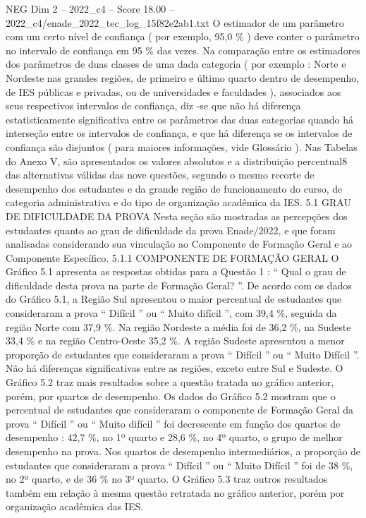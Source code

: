 \begin{textsample}{NEG Dim 2 – 2022\_c4 – Score 18.00 – 2022\_c4/enade\_2022\_tec\_log\_15f82e2ab1.txt}
O estimador de um parâmetro com um certo nível de confiança ( por exemplo, 95,0 \% ) deve conter o parâmetro no intervalo de confiança em 95 \% das vezes.
Na comparação entre os estimadores dos parâmetros de duas classes de uma dada categoria ( por exemplo : Norte e Nordeste nas grandes regiões, de primeiro e último quarto dentro de desempenho, de IES públicas e privadas, ou de universidades e faculdades ), associados aos seus respectivos intervalos de confiança, diz -se que não há diferença estatisticamente significativa entre os parâmetros das duas categorias quando há interseção entre os intervalos de confiança, e que há diferença se os intervalos de confiança são disjuntos ( para maiores informações, vide Glossário ).
Nas Tabelas do Anexo V, são apresentados os valores absolutos e a distribuição percentual8 das alternativas válidas das nove questões, segundo o mesmo recorte de desempenho dos estudantes e da grande região de funcionamento do curso, de categoria administrativa e do tipo de organização acadêmica da IES. 5.1 GRAU DE DIFICULDADE DA PROVA Nesta seção são mostradas as percepções dos estudantes quanto ao grau de dificuldade da prova Enade/2022, e que foram analisadas considerando sua vinculação ao Componente de Formação Geral e ao Componente Específico. 5.1.1 COMPONENTE DE FORMAÇÃO GERAL O Gráfico 5.1 apresenta as respostas obtidas para a Questão 1 : “ Qual o grau de dificuldade desta prova na parte de Formação Geral? ”.
De acordo com os dados do Gráfico 5.1, a Região Sul apresentou o maior percentual de estudantes que consideraram a prova “ Difícil ” ou “ Muito difícil ”, com 39,4 \%, seguida da região Norte com 37,9 \%.
Na região Nordeste a média foi de 36,2 \%, na Sudeste 33,4 \% e na região Centro-Oeste 35,2 \%.
A região Sudeste apresentou a menor proporção de estudantes que consideraram a prova “ Difícil ” ou “ Muito Difícil ”.
Não há diferenças significativas entre as regiões, exceto entre Sul e Sudeste.
O Gráfico 5.2 traz mais resultados sobre a questão tratada no gráfico anterior, porém, por quartos de desempenho.
Os dados do Gráfico 5.2 mostram que o percentual de estudantes que consideraram o componente de Formação Geral da prova “ Difícil ” ou “ Muito difícil ” foi decrescente em função dos quartos de desempenho : 42,7 \%, no 1º quarto e 28,6 \%, no 4º quarto, o grupo de melhor desempenho na prova.
Nos quartos de desempenho intermediários, a proporção de estudantes que consideraram a prova “ Difícil ” ou “ Muito Difícil ” foi de 38 \%, no 2º quarto, e de 36 \% no 3º quarto.
O Gráfico 5.3 traz outros resultados também em relação à mesma questão retratada no gráfico anterior, porém por organização acadêmica das IES.

\end{textsample}
